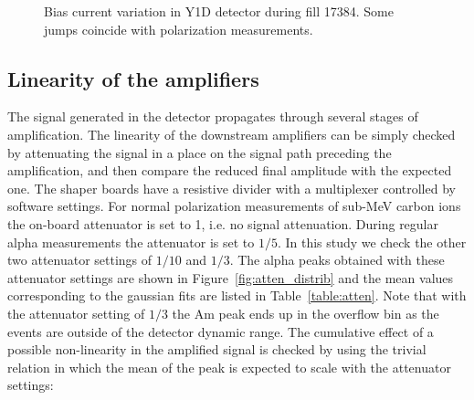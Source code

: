 \documentclass[a4paper,12pt]{article}
\begin{document}
\begin{figure}[p]
\caption{Bias current variation in Y1D detector during fill 17384. Some jumps
coincide with polarization measurements.}
\label{fig:bc_jumping}
\end{figure}

\subsection{Linearity of the amplifiers}

The signal generated in the detector propagates through several stages of
amplification. The linearity of the downstream amplifiers can be simply checked
by attenuating the signal in a place on the signal path preceding the
amplification, and then compare the reduced final amplitude with the expected
one. The shaper boards have a resistive divider with a multiplexer controlled by
software settings. For normal polarization measurements of sub-MeV carbon ions
the on-board attenuator is set to 1, i.e. no signal attenuation. During regular
alpha measurements the attenuator is set to $1/5$. In this study we check the
other two attenuator settings of $1/10$ and $1/3$. The alpha peaks obtained with
these attenuator settings are shown in Figure~\ref{fig:atten_distrib} and the
mean values corresponding to the gaussian fits are listed in
Table~\ref{table:atten}. Note that with the attenuator setting of $1/3$ the Am
peak ends up in the overflow bin as the events are outside of the detector
dynamic range. The cumulative effect of a possible non-linearity in the
amplified signal is checked by using the trivial relation in which the mean of
the peak is expected to scale with the attenuator settings:
\end{document}
